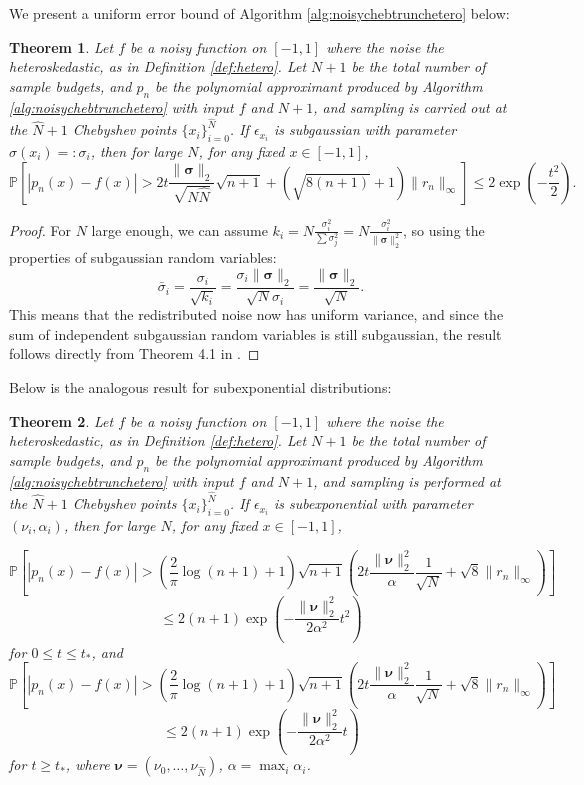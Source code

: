 \documentclass[pdflatex,sn-mathphys-num]{sn-jnl}%
\theoremstyle{thmstyleone}%
\newtheorem{theorem}{Theorem}%
\theoremstyle{thmstyletwo}%
\theoremstyle{thmstylethree}%
\begin{document}
We present a uniform error bound of Algorithm \ref{alg:noisychebtrunchetero} below:

\begin{theorem}\label{thm:error_bound_hetero}
	Let $f$ be a noisy function on $[-1,1]$ where the noise the heteroskedastic, as in Definition \ref{def:hetero}. Let $N+1$ be the total number of sample budgets, and $p_n$ be the polynomial approximant produced by Algorithm \ref{alg:noisychebtrunchetero} with input $f$ and $N+1$, and sampling is carried out at the $\hat{N}+1$ Chebyshev points $\{x_i\}_{i=0}^{\hat{N}}$. If $\epsilon_{x_i}$ is subgaussian with parameter $ \sigma(x_i)=: \sigma_i $, then for large $N$, for any fixed $x\in [-1,1]$,
	\[\mathbb{P} \left[|p_n(x)-f(x)| > 2t\frac{\|\bm{\sigma}\|_2}{\sqrt{N\hat{N}}} \sqrt{n+1} + (\sqrt{8(n+1)}+1)\|r_n \|_\infty\right] \leq 2\exp(-\frac{t^2}{2}).\] 
	
\end{theorem}

\begin{proof}
	For $N$ large enough, we can assume $k_i = N \frac{\sigma_i^2}{\sum \sigma_j^2} = N\frac{\sigma_i^2}{\|\bm{\sigma}\|_2^2}$, so using the properties of subgaussian random variables:
	\[ \bar{\sigma}_i = \frac{\sigma_i}{\sqrt{k_i}} = \frac{\sigma_i \|\bm{\sigma}\|_2}{\sqrt{N}\sigma_i} = \frac{\|\bm{\sigma}\|_2}{\sqrt{N}}. \]
	This means that the redistributed noise now has uniform variance, and since the sum of independent subgaussian random variables is still subgaussian, the result follows directly from Theorem 4.1 in \cite{yuji}.
\end{proof}


Below is the analogous result for subexponential distributions:


\begin{theorem}\label{thm:error_bound_hetero_exp}
	Let $f$ be a noisy function on $[-1,1]$ where the noise the heteroskedastic, as in Definition \ref{def:hetero}. Let $N+1$ be the total number of sample budgets, and $p_n$ be the polynomial approximant produced by Algorithm \ref{alg:noisychebtrunchetero} with input $f$ and $N+1$, and sampling is performed at the $\hat{N}+1$ Chebyshev points $\{x_i\}_{i=0}^{\hat{N}}$. If $\epsilon_{x_i}$ is subexponential with parameter $(\nu_i, \alpha_i)$, then for large $N$, for any fixed $x\in [-1,1]$,
	
	\[\mathbb{P} \left[|p_n(x)-f(x)|> \left(\frac{2}{\pi} \log(n+1)+1 \right) \sqrt{n+1} \left(2t\frac{\|\bm{\nu}\|_2^2}{\alpha} \frac{1}{\sqrt{N}}+\sqrt{8}\|r_n\|_\infty \right)\right]\]
	\[\leq 2(n+1)\exp(-\frac{\|\bm{\nu}\|_2^2}{2\alpha^2}t^2)\]
	for $0 \leq t\leq t_*$, and 
	\[\mathbb{P} \left[|p_n(x)-f(x)|> \left(\frac{2}{\pi} \log(n+1)+1 \right) \sqrt{n+1} \left(2t\frac{\|\bm{\nu}\|_2^2}{\alpha} \frac{1}{\sqrt{N}}+\sqrt{8}\|r_n\|_\infty \right)\right]\]
	\[\leq 2(n+1)\exp(-\frac{\|\bm{\nu}\|_2^2}{2\alpha^2}t)\]
	for $t \geq t_*$, where $ \bm{\nu} = (\nu_0,\dots, \nu_{\hat{N}})$, $ \alpha = \max_i \alpha_i$.
\end{theorem}
\end{document}
